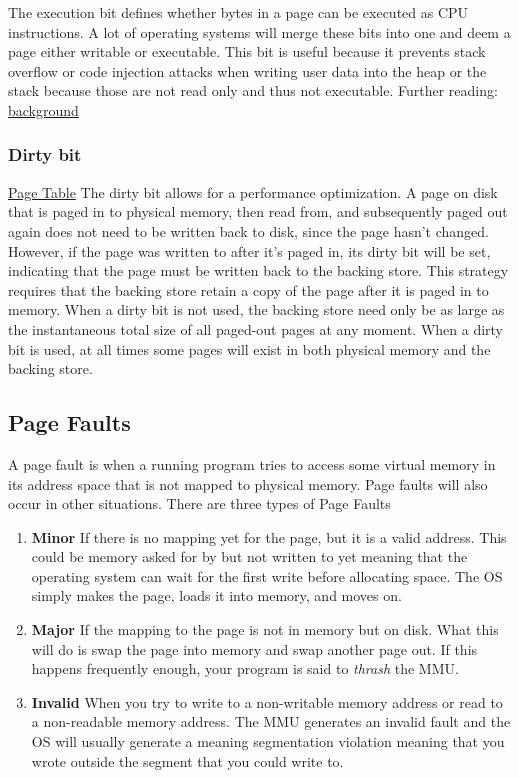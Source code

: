 The execution bit defines whether bytes in a page can be executed as CPU instructions.
A lot of operating systems will merge these bits into one and deem a page either writable or executable.
This bit is useful because it prevents stack overflow or code injection attacks when writing user data into the heap or the stack because those are not read only and thus not executable.
Further reading: \href{http://en.wikipedia.org/wiki/NX\_bit\#Hardware\_background}{background}

\subsubsection{Dirty bit}

\href{http://en.wikipedia.org/wiki/Page\_table\#Page\_table\_data}{Page Table} The dirty bit allows for a performance optimization.
A page on disk that is paged in to physical memory, then read from, and subsequently paged out again does not need to be written back to disk, since the page hasn't changed.
However, if the page was written to after it's paged in, its dirty bit will be set, indicating that the page must be written back to the backing store.
This strategy requires that the backing store retain a copy of the page after it is paged in to memory.
When a dirty bit is not used, the backing store need only be as large as the instantaneous total size of all paged-out pages at any moment.
When a dirty bit is used, at all times some pages will exist in both physical memory and the backing store.

\subsection{Page Faults}

A page fault is when a running program tries to access some virtual memory in its address space that is not mapped to physical memory. Page faults will also occur in other situations. There are three types of Page Faults

\begin{enumerate}
 \item \textbf{Minor} If there is no mapping yet for the page, but it is a valid address. This could be memory asked for by  but not written to yet meaning that the operating system can wait for the first write before allocating space. The OS simply makes the page, loads it into memory, and moves on.

 \item \textbf{Major} If the mapping to the page is not in memory but on disk. What this will do is swap the page into memory and swap another page out. If this happens frequently enough, your program is said to \emph{thrash} the MMU.

 \item \textbf{Invalid} When you try to write to a non-writable memory address or read to a non-readable memory address. The MMU generates an invalid fault and the OS will usually generate a  meaning segmentation violation meaning that you wrote outside the segment that you could write to.
\end{enumerate}

